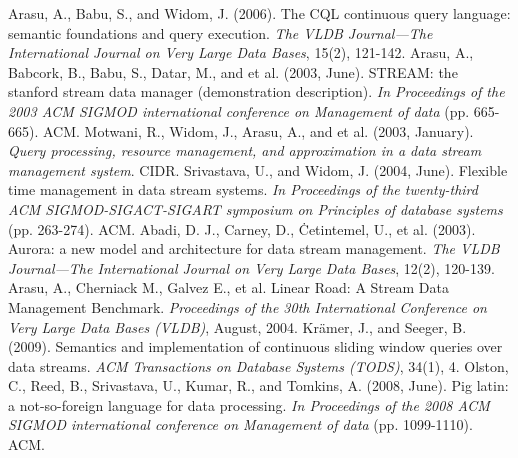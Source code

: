 \documentclass[conference, twocolumn, 11pt]{IEEEtran}
\theoremstyle{definition}
\begin{document}
%
%
%
\begin{thebibliography}{1}

        Arasu, A., Babu, S., and Widom, J. (2006). The CQL continuous query language: semantic foundations and query execution. \emph{The VLDB Journal—The International Journal on Very Large Data Bases}, 15(2), 121-142.
        Arasu, A., Babcork, B., Babu, S., Datar, M., and et al. (2003, June). STREAM: the stanford stream data manager (demonstration description). \emph{In Proceedings of the 2003 ACM SIGMOD international conference on Management of data} (pp. 665-665). ACM.
        Motwani, R., Widom, J., Arasu, A., and et al. (2003, January). \emph{Query processing, resource management, and approximation in a data stream management system}. CIDR.
        Srivastava, U., and Widom, J. (2004, June). Flexible time management in data stream systems. \emph{In Proceedings of the twenty-third ACM SIGMOD-SIGACT-SIGART symposium on Principles of database systems} (pp. 263-274). ACM.
        Abadi, D. J., Carney, D., {\.C}etintemel, U., et al. (2003). Aurora: a new model and architecture for data stream management. \emph{The VLDB Journal—The International Journal on Very Large Data Bases}, 12(2), 120-139.
        Arasu, A., Cherniack M., Galvez E., et al. Linear Road: A Stream Data Management Benchmark. \emph{Proceedings of the 30th International Conference on Very Large Data Bases (VLDB)}, August, 2004.
        Kr{\"a}mer, J., and Seeger, B. (2009). Semantics and implementation of continuous sliding window queries over data streams. \emph{ACM Transactions on Database Systems (TODS)}, 34(1), 4.
        Olston, C., Reed, B., Srivastava, U., Kumar, R., and Tomkins, A. (2008, June). Pig latin: a not-so-foreign language for data processing. \emph{In Proceedings of the 2008 ACM SIGMOD international conference on Management of data} (pp. 1099-1110). ACM.

\end{thebibliography}
\end{document}
